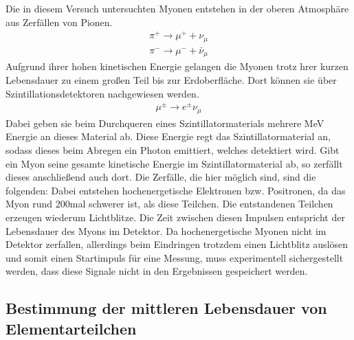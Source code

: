 %
Die in diesem Versuch untersuchten Myonen entstehen in der oberen Atmosphäre aus Zerfällen von Pionen.
%
\begin{align}
  \pi^+\rightarrow\mu^++\nu_\mu \\
  \pi^-\rightarrow\mu^-+\bar{\nu}_\mu
\end{align}
%
Aufgrund ihrer hohen kinetischen Energie gelangen die Myonen trotz hrer kurzen Lebensdauer zu einem großen Teil bis zur
Erdoberfläche. Dort können sie über Szintillationsdetektoren nachgewiesen werden.
%
\begin{align}
  \mu^\pm\rightarrow e^\pm\nu_\mu
\end{align}
%
Dabei geben sie beim Durchqueren eines Szintillatormaterials mehrere MeV Energie an dieses Material ab. Diese Energie regt das Szintillatormaterial an, sodass dieses beim Abregen ein Photon emittiert, welches detektiert wird.
Gibt ein Myon seine gesamte kinetische Energie im Szintillatormaterial ab, so zerfällt dieses anschließend auch dort. Die Zerfälle, die hier möglich sind, sind die folgenden:
Dabei entstehen hochenergetische Elektronen bzw. Positronen, da das Myon rund 200mal schwerer ist, als diese Teilchen.
Die entstandenen Teilchen erzeugen wiederum Lichtblitze. Die Zeit zwischen diesen Impulsen entspricht der Lebensdauer
des Myons im Detektor. Da hochenergetische Myonen nicht im Detektor zerfallen, allerdings beim Eindringen trotzdem einen
Lichtblitz auslösen und somit einen Startimpuls für eine Messung, muss experimentell sichergestellt werden, dass diese
Signale nicht in den Ergebnissen gespeichert werden.
%
\subsection{Bestimmung der mittleren Lebensdauer von Elementarteilchen}

